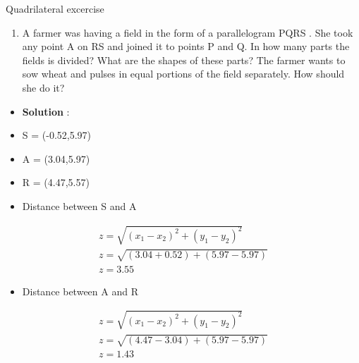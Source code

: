 \begin{frame}{Quadrilateral excercise}
\begin{enumerate}
\conti
\item A farmer was having a field in the form of a
parallelogram PQRS . She took any point A on
RS and joined it to points P and Q. In how
many parts the fields is divided? What are the
shapes of these parts? The farmer wants to sow
wheat and pulses in equal portions of the field
separately. How should she do it?
\seti
\end{enumerate}
\begin{itemize}
\item \textbf{Solution} :
\begin{center}

\end{center}
\end{itemize}
\end{frame}
\begin{frame}
\begin{itemize}
\item S = (-0.52,5.97)\\
\item A = (3.04,5.97)\\
\item R = (4.47,5.57)
\item  Distance between S and A
\end{itemize}
\begin{align*}
z = \sqrt{(x_1 - x_2)^2 + (y_1 - y_2)^2}\\
z = \sqrt{(3.04 + 0.52) + (5.97 - 5.97)}\\
z = 3.55
\end{align*}
\begin{itemize}
\item Distance between A and R
\end{itemize}
\begin{align*}
z = \sqrt{(x_1 - x_2)^2 + (y_1 - y_2)^2}\\
z = \sqrt{(4.47 - 3.04) + (5.97 - 5.97)}\\
z = 1.43
\end{align*}
\end{frame}
